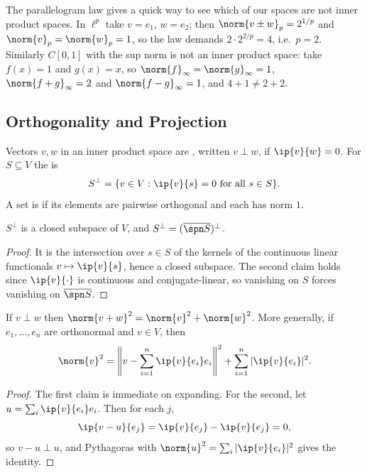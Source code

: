\begin{example}
	The parallelogram law gives a quick way to see which of our spaces are not inner product spaces. In $\ell^p$ take $v = e_1$, $w = e_2$; then $\norm{v \pm w}_p = 2^{1/p}$ and $\norm{v}_p = \norm{w}_p = 1$, so the law demands $2 \cdot 2^{2/p} = 4$, i.e.\ $p = 2$. Similarly $C[0,1]$ with the sup norm is not an inner product space: take $f(x) = 1$ and $g(x)=x$, so $\norm{f}_\infty = \norm{g}_\infty = 1$, $\norm{f+g}_\infty=2$ and $\norm{f-g}_\infty = 1$, and $4 + 1 \neq 2 + 2$.
\end{example}

\subsection{Orthogonality and Projection}

\begin{definition}[Orthogonality]
	Vectors $v,w$ in an inner product space are , written $v \perp w$, if $\ip{v}{w}=0$. For $S \subseteq V$ the  is
	$$S^\perp = \{ v \in V : \ip{v}{s}=0 \text{ for all } s \in S \}.$$
	A set is  if its elements are pairwise orthogonal and each has norm $1$.
\end{definition}

\begin{proposition}
	$S^\perp$ is a closed subspace of $V$, and $S^\perp = (\overline{\spn S})^\perp$.
\end{proposition}

\begin{proof}
	It is the intersection over $s \in S$ of the kernels of the continuous linear functionals $v \mapsto \ip{v}{s}$, hence a closed subspace. The second claim holds since $\ip{v}{\cdot}$ is continuous and conjugate-linear, so vanishing on $S$ forces vanishing on $\overline{\spn S}$.
\end{proof}

\begin{proposition}[Pythagoras]
	If $v \perp w$ then $\norm{v+w}^2 = \norm{v}^2+\norm{w}^2$. More generally, if $e_1,\dots,e_n$ are orthonormal and $v \in V$, then
	$$\norm{v}^2 = \left\| v - \sum_{i=1}^n \ip{v}{e_i}e_i \right\|^2 + \sum_{i=1}^n |\ip{v}{e_i}|^2.$$
\end{proposition}

\begin{proof}
	The first claim is immediate on expanding. For the second, let $u = \sum_i \ip{v}{e_i}e_i$. Then for each $j$,
	$$\ip{v - u}{e_j} = \ip{v}{e_j} - \ip{v}{e_j} = 0,$$
	so $v - u \perp u$, and Pythagoras with $\norm{u}^2 = \sum_i |\ip{v}{e_i}|^2$ gives the identity.
\end{proof}

